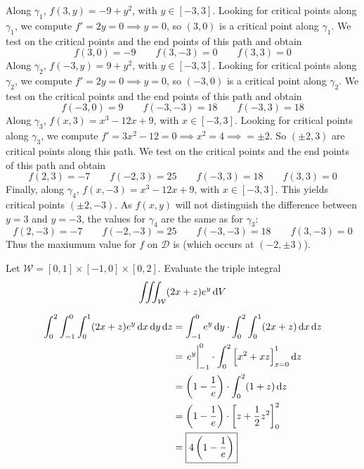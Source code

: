 \documentclass[12pt,answers]{exam}
\begin{document}
\begin{questions}
\begin{parts}
\begin{solution}
    Along $\gamma_1$, $f(3, y) = -9 + y^2$, with $y \in [-3, 3]$. 
    Looking for critical points along $\gamma_1$, we compute
    $f' = 2y = 0 \implies y = 0$, so $(3, 0)$ is a critical point along $\gamma_1$. We test on the critical points and the end points of this path and obtain
    \[
        f(3, 0) = -9 \qquad f(3, -3) = 0 \qquad f(3, 3) = 0
    \]
    Along $\gamma_2$, $f(-3, y) = 9 + y^2$, with $y \in [-3, 3]$. 
    Looking for critical points along $\gamma_2$, we compute $f' = 2y = 0 \implies y = 0$, so $(-3, 0)$ is a critical point along $\gamma_2$. 
    We test on the critical points and the end points of this path and obtain
    \[
        f(-3, 0) = 9 \qquad f(-3, -3) = 18 \qquad f(-3, 3) = 18
    \]
    Along $\gamma_3$, $f(x, 3) = x^3 - 12x + 9$, with $x \in [-3, 3]$.
    Looking for critical points along $\gamma_3$, we compute $f' = 3x^2 - 12 = 0 \implies x^2 = 4 \implies = \pm 2$. So $(\pm2, 3)$ are critical points along this path.
    We test on the critical points and the end points of this path and obtain
    \[
        f(2, 3) = -7 \qquad f(-2, 3) = 25 \qquad f(-3, 3) = 18 \qquad f(3,3) = 0
    \]
    Finally, along $\gamma_4$, $f(x, -3) = x^3 - 12x + 9$, with $x \in [-3, 3]$.
    This yields critical points $(\pm2, -3)$. As $f(x, y)$ will not distinguish the difference between $y=3$ and $y=-3$, the values for $\gamma_4$ are the same as for $\gamma_3$:
    \[
        f(2, -3) = -7 \qquad f(-2, -3) = 25 \qquad f(-3, -3) = 18 \qquad f(3,-3) = 0
    \]
    Thus the maxiumum value for $f$ on $\mathcal D$ is  (which occurs at $(-2, \pm 3)$).
\end{solution}
\end{parts}

\newpage
\question[10]
Let $\mathcal W = [0, 1] \times [-1, 0] \times [0, 2]$. 
Evaluate the triple integral
\[
    \iiint_{\mathcal W} (2x + z)e^y \dif V
\]
\begin{solution}
    \begin{align*}
        \int_0^2 \int_{-1}^0 \int_0^1 (2x+z)e^y \dif x \dif y \dif z
        &=  \int_{-1}^0 e^y \dif y \cdot \int_0^2 \int_0^1 (2x+z) \dif x \dif z \\ 
        &= \eval{e^y}_{-1}^0 \cdot \int_0^2 \left[x^2 + xz\right]_{x=0}^1 \dif z \\ 
        &= \left(1-\frac 1e\right) \cdot \int_0^2 (1+z) \dif z \\ 
        &= \left(1-\frac 1e\right) \cdot \left[z + \frac12 z^2\right]_0^2 \\ 
        &= \boxed{4\left(1 - \frac1e\right)}
    \end{align*}
\end{solution}


\end{questions}
\end{document}

